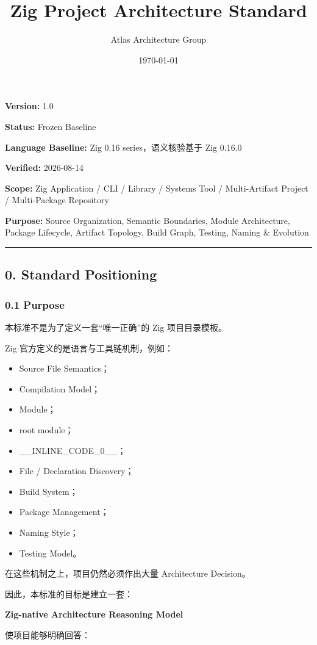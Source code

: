\documentclass[11pt,a4paper]{article}
\title{\textbf{\Large Zig Project Architecture Standard}}
\author{Atlas Architecture Group}
\date{\today}
\begin{document}
\maketitle
\tableofcontents
\newpage

\textbf{Version:} 1.0

\textbf{Status:} Frozen Baseline

\textbf{Language Baseline:} Zig 0.16 series，语义核验基于 Zig 0.16.0

\textbf{Verified:} 2026-08-14

\textbf{Scope:} Zig Application / CLI / Library / Systems Tool / Multi-Artifact Project / Multi-Package Repository

\textbf{Purpose:} Source Organization, Semantic Boundaries, Module Architecture, Package Lifecycle, Artifact Topology, Build Graph, Testing, Naming \& Evolution

\vspace{0.5em}\hrule\vspace{0.5em}
\subsection{0. Standard Positioning}
\subsubsection{0.1 Purpose}
本标准不是为了定义一套“唯一正确”的 Zig 项目目录模板。

Zig 官方定义的是语言与工具链机制，例如：

\begin{itemize}
  \item Source File Semantics；
  \item Compilation Model；
  \item Module；
  \item root module；
  \item \_\_INLINE\_CODE\_0\_\_；
  \item File / Declaration Discovery；
  \item Build System；
  \item Package Management；
  \item Naming Style；
  \item Testing Model。
\end{itemize}
在这些机制之上，项目仍然必须作出大量 Architecture Decision。

因此，本标准的目标是建立一套：

\begin{gfmBlockquote}
\textbf{Zig-native Architecture Reasoning Model}
\end{gfmBlockquote}
使项目能够明确回答：
\end{document}
